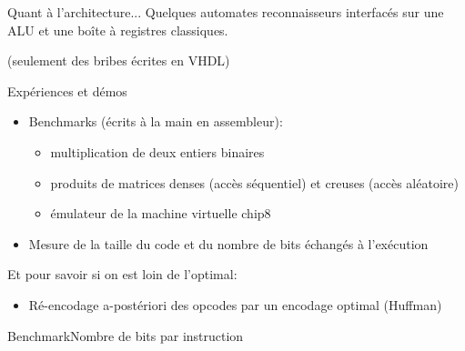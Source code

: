 \documentclass[slidetop,11pt,table]{beamer}
\begin{document}
\begin{frame}{Quant à l'architecture...}
  Quelques automates reconnaisseurs interfacés sur une ALU et une boîte à registres classiques. 
  
  (seulement des bribes écrites en VHDL)

\end{frame}



\begin{frame}{Expériences et démos}
  \begin{itemize}
  \item Benchmarks (écrits à la main en assembleur):
    \begin{itemize}
    \item multiplication de deux entiers binaires
    \item produits de matrices denses (accès séquentiel) et creuses (accès aléatoire)
    \item émulateur de la machine virtuelle chip8
    \end{itemize}
  \item Mesure de la taille du code et du nombre de bits échangés à l'exécution
  \end{itemize}

  Et pour savoir si on est loin de l'optimal:
  \begin{itemize}
  \item Ré-encodage a-postériori des opcodes par un encodage
    optimal (Huffman)
  \end{itemize}

\end{frame}





\begin{frame}{Benchmark}{Nombre de bits par instruction}
    \centering
\end{frame}
\end{document}
